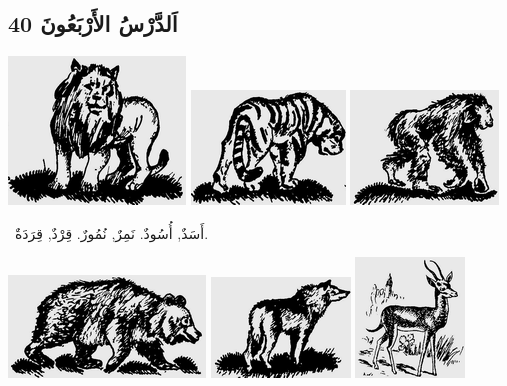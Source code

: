 \documentclass[a5paper]{article}
\begin{document}
\subsection[اَلدَّرْسُ الأَرْبَعُونَ 40]{اَلدَّرْسُ الأَرْبَعُونَ 40}
 \includegraphics[width=1.8543in,height=1.552in]{MuhammadBagauddinlatinized-img112.png}   \includegraphics[width=1.6146in,height=1.198in]{MuhammadBagauddinlatinized-img113.png}   \includegraphics[width=1.552in,height=1.198in]{MuhammadBagauddinlatinized-img114.png} 

\ أَسَدٌ, أُسُودٌ. نَمِرٌ, نُمُورٌ. قِرْدٌ, قِرَدَةٌ. 

 \includegraphics[width=2.0626in,height=1.0728in]{MuhammadBagauddinlatinized-img115.png}   \includegraphics[width=1.4583in,height=1.052in]{MuhammadBagauddinlatinized-img116.png}   \includegraphics[width=1.1457in,height=1.2602in]{MuhammadBagauddinlatinized-img117.png} 
\end{document}
